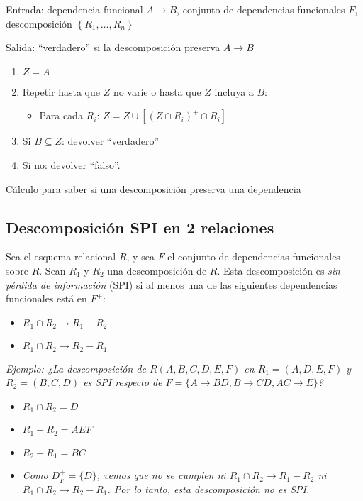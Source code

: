 \documentclass[a4paper, twoside]{article}
\begin{document}
\begin{algorithm}[H]
Entrada: dependencia funcional $A\to B$, conjunto de dependencias
funcionales $F$, descomposición $\left\{ R_{1},\ldots,R_{n}\right\} $

Salida: ``verdadero'' si la descomposición preserva $A\to B$
\begin{enumerate}
\item $Z=A$
\item Repetir hasta que $Z$ no varíe o hasta que $Z$ incluya a $B$:

\begin{itemize}
\item Para cada $R_{i}$: $Z=Z\cup\left[\left(Z\cap R_{i}\right)^{+}\cap R_{i}\right]$
\end{itemize}
\item Si $B\subseteq Z$: devolver ``verdadero''
\item Si no: devolver ``falso''.
\end{enumerate}
\protect\caption{Cálculo para saber si una descomposición preserva una dependencia}
\end{algorithm}



\subsection{Descomposición SPI en 2 relaciones}

Sea el esquema relacional $R$, y sea $F$ el conjunto de dependencias
funcionales sobre $R$. Sean $R_{1}$ y $R_{2}$ una descomposición
de $R$. Esta descomposición es \emph{sin pérdida de información}
(SPI) si al menos una de las siguientes dependencias funcionales está
en $F^{+}$:
\begin{itemize}
\item $R_{1}\cap R_{2}\to R_{1}-R_{2}$
\item $R_{1}\cap R_{2}\to R_{2}-R_{1}$
\end{itemize}
\emph{Ejemplo: ¿La descomposición de $R(A,B,C,D,E,F)$ en $R_{1}=(A,D,E,F)$
y $R_{2}=(B,C,D)$ es SPI respecto de $F=\{A\to BD,B\to CD,AC\to E\}$?}
\begin{itemize}
\item $R_{1}\cap R_{2}=D$
\item $R_{1}-R_{2}=AEF$
\item $R_{2}-R_{1}=BC$
\item \emph{Como $D_{F}^{+}=\{D\}$, vemos que no se cumplen ni $R_{1}\cap R_{2}\to R_{1}-R_{2}$
ni $R_{1}\cap R_{2}\to R_{2}-R_{1}$. Por lo tanto, esta descomposición
no es SPI. }
\end{itemize}
\end{document}
